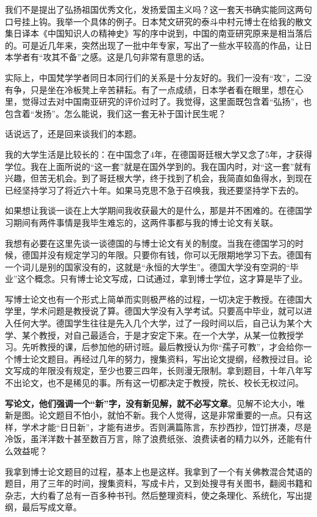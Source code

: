 \documentclass[UTF8,a4paper,8pt]{ctexbook}
\begin{document}
		我们不是提出了弘扬祖国优秀文化，发扬爱国主义吗？这一套天书确实能同这两句口号挂上钩。我举一个具体的例子。日本梵文研究的泰斗中村元博士在给我的散文集日译本《中国知识人の精神史》写的序中说到，中国的南亚研究原来是相当落后的。可是近几年来，突然出现了一批中年专家，写出了一些水平较高的作品，让日本学者有“攻其不备”之感。这是几句非常有意思的话。
		
		实际上，中国梵学学者同日本同行们的关系是十分友好的。我们一没有“攻”，二没有争，只是坐在冷板凳上辛苦耕耘。有了一点成绩，日本学者看在眼里，想在心里，觉得过去对中国南亚研究的评价过时了。我觉得，这里面既包含着“弘扬”，也包含着“发扬”。怎么能说，我们这一套无补于国计民生呢？
		
		话说远了，还是回来谈我们的本题。
		
		我的大学生活是比较长的：在中国念了4年，在德国哥廷根大学又念了5年，才获得学位。我在上面所说的“这一套”就是在国外学到的。我在国内时，对“这一套”就有兴趣，但苦无机会。到了哥廷根大学，终于找到了机会，我简直如鱼得水，到现在已经坚持学习了将近六十年。如果马克思不急于召唤我，我还要坚持学下去的。
		
		如果想让我谈一谈在上大学期间我收获最大的是什么，那是并不困难的。在德国学习期间有两件事情是我毕生难忘的，这两件事都与我的博士论文有关联。
		
		我想有必要在这里先谈一谈德国的与博士论文有关的制度。当我在德国学习的时候，德国并没有规定学习的年限。只要你有钱，你可以无限期地学习下去。德国有一个词儿是别的国家没有的，这就是“永恒的大学生”。德国大学没有空洞的“毕业”这个概念。只有博士论文写成，口试通过，拿到博士学位，这才算是毕了业。
		
		写博士论文也有一个形式上简单而实则极严格的过程，一切决定于教授。在德国大学里，学术问题是教授说了算。德国大学没有入学考试。只要高中毕业，就可以进入任何大学。德国学生往往是先入几个大学，过了一段时间以后，自己认为某个大学、某个教授，对自己最适合，于是才安定下来。在一个大学，从某一位教授学习。先听教授的课，后参加他的研讨班。最后教授认为你“孺子可教”，才会给你一个博士论文题目。再经过几年的努力，搜集资料，写出论文提纲，经教授过目。论文写成的年限没有规定，至少也要三四年，长则漫无限制。拿到题目，十年八年写不出论文，也不是稀见的事。所有这一切都决定于教授，院长、校长无权过问。
		
		\textbf{写论文，他们强调一个“新”字，没有新见解，就不必写文章}。见解不论大小，唯新是图。论文题目不怕小，就怕不新。我个人觉得，这是非常重要的一点。只有这样，学术才能“日日新”，才能有进步。否则满篇陈言，东抄西抄，饾饤拼凑，尽是冷饭，虽洋洋数十甚至数百万言，除了浪费纸张、浪费读者的精力以外，还能有什么效益呢？
		
		我拿到博士论文题目的过程，基本上也是这样。我拿到了一个有关佛教混合梵语的题目，用了三年的时间，搜集资料，写成卡片，又到处搜寻有关图书，翻阅书籍和杂志，大约看了总有一百多种书刊。然后整理资料，使之条理化、系统化，写出提纲，最后写成文章。
		
\end{document}

